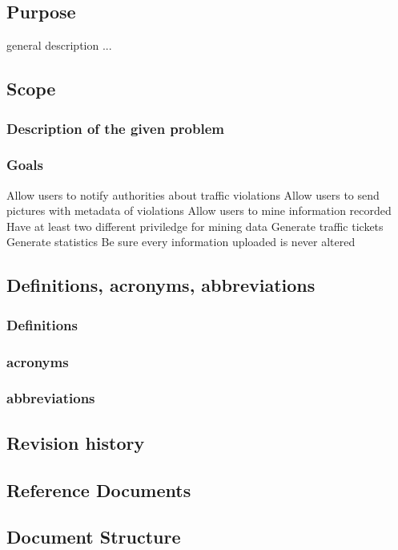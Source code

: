 




\subsection{Purpose}
general description ...

\subsection{Scope}

\subsubsection{Description of the given problem}


\subsubsection{Goals}
\begin{enumerate}
   Allow users to notify authorities about traffic violations
   Allow users to send pictures with metadata of violations
   Allow users to mine information recorded
   Have at least two different  priviledge for mining data
   Generate traffic tickets
   Generate statistics
   Be sure every information uploaded is never altered
\end{enumerate}



\subsection{Definitions,  acronyms,  abbreviations}
\subsubsection{Definitions}
\subsubsection{acronyms}
\subsubsection{abbreviations}


\subsection{Revision history}


\subsection{Reference Documents}



\subsection{Document Structure}
